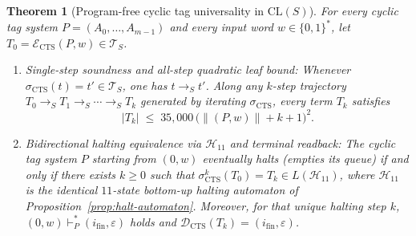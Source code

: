 \documentclass[11pt,reqno]{amsart}
\numberwithin{equation}{section}
\theoremstyle{plain}
\newtheorem{theorem}{Theorem}[section]
\theoremstyle{definition}
\theoremstyle{remark}
\newcommand{\CLS}{\mathrm{CL}(S)}
\newcommand{\TS}{\mathcal{T}_S}
\newcommand{\redS}{\to_S}
\begin{document}
\begin{theorem}[Program-free cyclic tag universality in $\CLS$]\label{thm:cts-universality}
For every cyclic tag system $P = (A_0, \dots, A_{m-1})$ and every input word $w \in \{0,1\}^*$, let $T_0 = \mathcal{E}_{\mathrm{CTS}}(P, w) \in \TS$.
\begin{enumerate}[label=(\roman*),leftmargin=2.2em]
  \item \emph{Single-step soundness and all-step quadratic leaf bound:} Whenever $\sigma_{\mathrm{CTS}}(t) = t' \in \TS$, one has $t \redS t'$. Along any $k$-step trajectory $T_0 \redS T_1 \redS \cdots \redS T_k$ generated by iterating $\sigma_{\mathrm{CTS}}$, every term $T_k$ satisfies
  \begin{equation}\label{eq:cts-traj-bound}
    |T_k| \;\le\; 35{,}000\,\bigl(\|(P,w)\| + k + 1\bigr)^2.
  \end{equation}
  \item \emph{Bidirectional halting equivalence via $\mathcal{H}_{11}$ and terminal readback:} The cyclic tag system $P$ starting from $(0, w)$ eventually halts (empties its queue) if and only if there exists $k \ge 0$ such that $\sigma_{\mathrm{CTS}}^k(T_0) = T_k \in L(\mathcal{H}_{11})$, where $\mathcal{H}_{11}$ is the identical $11$-state bottom-up halting automaton of Proposition~\ref{prop:halt-automaton}. Moreover, for that unique halting step $k$, $(0, w) \vdash_P^* (i_{\mathrm{fin}}, \varepsilon)$ holds and $\mathcal{D}_{\mathrm{CTS}}(T_k) = (i_{\mathrm{fin}}, \varepsilon)$.
\end{enumerate}
\end{theorem}
\end{document}
